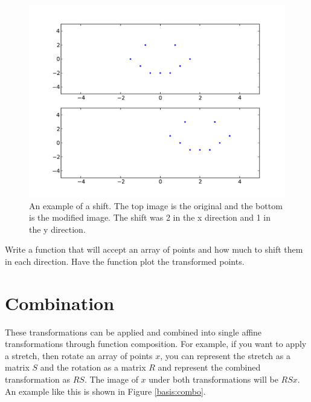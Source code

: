 \begin{figure}[H]
\includegraphics[scale = .5]{shift.pdf}
\caption{
An example of a shift.
The top image is the original and the bottom is the modified image.
The shift was 2 in the x direction and 1 in the y direction.}
\end{figure}

\begin{problem}
Write a function that will accept an array of points and how much to shift them in each direction.
Have the function plot the transformed points.
\end{problem}

\section*{Combination}
These transformations can be applied and combined into single affine transformations through function composition.
For example, if you want to apply a stretch, then rotate an array of points $x$, you can represent the stretch as a matrix $S$ and the rotation as a matrix $R$ and represent the combined transformation as $R S$.
The image of $x$ under both transformations will be $R S x$.
An example like this is shown in Figure \ref{basis:combo}.

